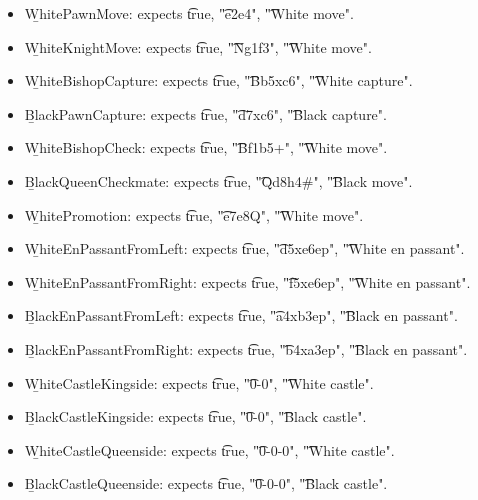 \begin{itemize}
    \item \b{WhitePawnMove}: expects \t{true}, \t{"e2e4"}, \t{"White move"}.

    \item \b{WhiteKnightMove}: expects \t{true}, \t{"Ng1f3"}, \t{"White move"}.

    \item \b{WhiteBishopCapture}: expects \t{true}, \t{"Bb5xc6"}, \t{"White capture"}.

    \item \b{BlackPawnCapture}: expects \t{true}, \t{"d7xc6"}, \t{"Black capture"}.

    \item \b{WhiteBishopCheck}: expects \t{true}, \t{"Bf1b5+"}, \t{"White move"}.

    \item \b{BlackQueenCheckmate}: expects \t{true}, \t{"Qd8h4\#"}, \t{"Black move"}.

    \item \b{WhitePromotion}: expects \t{true}, \t{"e7e8Q"}, \t{"White move"}.

    \item \b{WhiteEnPassantFromLeft}: expects \t{true}, \t{"d5xe6ep"}, \t{"White en passant"}.

    \item \b{WhiteEnPassantFromRight}: expects \t{true}, \t{"f5xe6ep"}, \t{"White en passant"}.

    \item \b{BlackEnPassantFromLeft}: expects \t{true}, \t{"a4xb3ep"}, \t{"Black en passant"}.

    \item \b{BlackEnPassantFromRight}: expects \t{true}, \t{"b4xa3ep"}, \t{"Black en passant"}.

    \item \b{WhiteCastleKingside}: expects \t{true}, \t{"0-0"}, \t{"White castle"}.

    \item \b{BlackCastleKingside}: expects \t{true}, \t{"0-0"}, \t{"Black castle"}.

    \item \b{WhiteCastleQueenside}: expects \t{true}, \t{"0-0-0"}, \t{"White castle"}.

    \item \b{BlackCastleQueenside}: expects \t{true}, \t{"0-0-0"}, \t{"Black castle"}.
\end{itemize}


